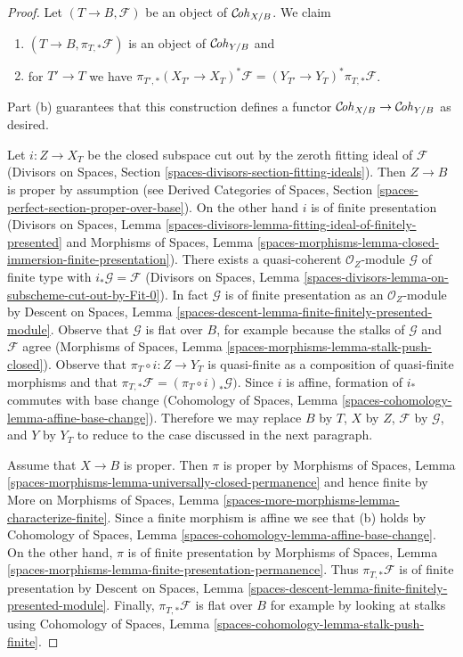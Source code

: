 \begin{proof}
Let $(T \to B, \mathcal{F})$ be an object of $\mathcal{C}\!\mathit{oh}_{X/B}$.
We claim
\begin{enumerate}
\item[(a)] $(T \to B, \pi_{T, *}\mathcal{F})$ is an object
of $\mathcal{C}\!\mathit{oh}_{Y/B}$ and
\item[(b)] for $T' \to T$ we have
$\pi_{T', *}(X_{T'} \to X_T)^*\mathcal{F} =
(Y_{T'} \to Y_T)^*\pi_{T, *}\mathcal{F}$.
\end{enumerate}
Part (b) guarantees that this construction defines a functor
$\mathcal{C}\!\mathit{oh}_{X/B} \to \mathcal{C}\!\mathit{oh}_{Y/B}$ as desired.

\medskip\noindent
Let $i : Z \to X_T$ be the closed subspace cut out by the zeroth
fitting ideal of $\mathcal{F}$
(Divisors on Spaces, Section
\ref{spaces-divisors-section-fitting-ideals}).
Then $Z \to B$ is proper by assumption (see
Derived Categories of Spaces, Section
\ref{spaces-perfect-section-proper-over-base}).
On the other hand $i$ is of finite presentation
(Divisors on Spaces, Lemma
\ref{spaces-divisors-lemma-fitting-ideal-of-finitely-presented} and
Morphisms of Spaces, Lemma
\ref{spaces-morphisms-lemma-closed-immersion-finite-presentation}).
There exists a quasi-coherent $\mathcal{O}_Z$-module
$\mathcal{G}$ of finite type with $i_*\mathcal{G} = \mathcal{F}$
(Divisors on Spaces, Lemma
\ref{spaces-divisors-lemma-on-subscheme-cut-out-by-Fit-0}).
In fact $\mathcal{G}$ is of finite presentation as an $\mathcal{O}_Z$-module
by Descent on Spaces, Lemma
\ref{spaces-descent-lemma-finite-finitely-presented-module}.
Observe that $\mathcal{G}$ is flat over $B$, for example
because the stalks of $\mathcal{G}$ and $\mathcal{F}$ agree
(Morphisms of Spaces, Lemma \ref{spaces-morphisms-lemma-stalk-push-closed}).
Observe that $\pi_T \circ i : Z \to Y_T$ is quasi-finite as a composition
of quasi-finite morphisms and that
$\pi_{T, *}\mathcal{F} = (\pi_T \circ i)_*\mathcal{G})$.
Since $i$ is affine, formation of $i_*$ commutes with base change
(Cohomology of Spaces, Lemma \ref{spaces-cohomology-lemma-affine-base-change}).
Therefore we may replace $B$ by $T$, $X$ by $Z$,
$\mathcal{F}$ by $\mathcal{G}$, and $Y$ by $Y_T$
to reduce to the case discussed in the next paragraph.

\medskip\noindent
Assume that $X \to B$ is proper. Then $\pi$ is proper
by Morphisms of Spaces, Lemma
\ref{spaces-morphisms-lemma-universally-closed-permanence}
and hence finite by
More on Morphisms of Spaces,
Lemma \ref{spaces-more-morphisms-lemma-characterize-finite}.
Since a finite morphism is affine we see that (b) holds by
Cohomology of Spaces, Lemma \ref{spaces-cohomology-lemma-affine-base-change}.
On the other hand, $\pi$ is of finite presentation by
Morphisms of Spaces, Lemma
\ref{spaces-morphisms-lemma-finite-presentation-permanence}.
Thus $\pi_{T, *}\mathcal{F}$ is of finite presentation by
Descent on Spaces, Lemma
\ref{spaces-descent-lemma-finite-finitely-presented-module}.
Finally, $\pi_{T, *}\mathcal{F} $ is flat over $B$ for example
by looking at stalks using
Cohomology of Spaces, Lemma \ref{spaces-cohomology-lemma-stalk-push-finite}.
\end{proof}


